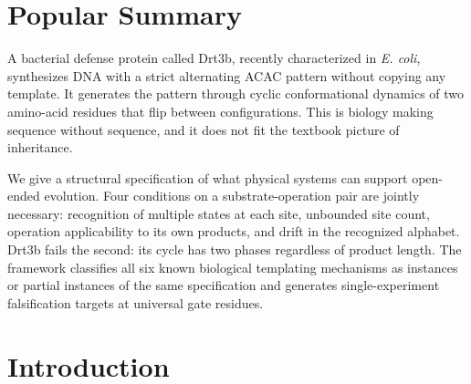 \documentclass[aps,prx,reprint,amsmath,amssymb,floatfix,superscriptaddress,nofootinbib]{revtex4-2}
\theoremstyle{plain-thm}
\theoremstyle{definition-thm}
\begin{document}
\begin{abstract}
ensemble. Family-level apparatus application across 1{,}232 Drt3b homologs confirms in-envelope behavior for 33 secondary-residue clades and a 17-fold elevation in dG misincorporation at the A-state for 6 E26$\to$D primary-gate clades, the framework-predicted shift for selectivity-gate degradation. Two distinct universal-gate classes generate single-experiment falsification targets: an architectural gate (R253) whose substitution predicts cycle-architecture collapse, and a selectivity gate (G248) whose substitution predicts intact cycle with shifted product composition.
\end{abstract}

\maketitle

\section*{Popular Summary}

A bacterial defense protein called Drt3b, recently characterized in \emph{E. coli}, synthesizes DNA with a strict alternating ACAC pattern without copying any template. It generates the pattern through cyclic conformational dynamics of two amino-acid residues that flip between configurations. This is biology making sequence without sequence, and it does not fit the textbook picture of inheritance.

We give a structural specification of what physical systems can support open-ended evolution. Four conditions on a substrate-operation pair are jointly necessary: recognition of multiple states at each site, unbounded site count, operation applicability to its own products, and drift in the recognized alphabet. Drt3b fails the second: its cycle has two phases regardless of product length. The framework classifies all six known biological templating mechanisms as instances or partial instances of the same specification and generates single-experiment falsification targets at universal gate residues.


\section{Introduction}
\end{document}
